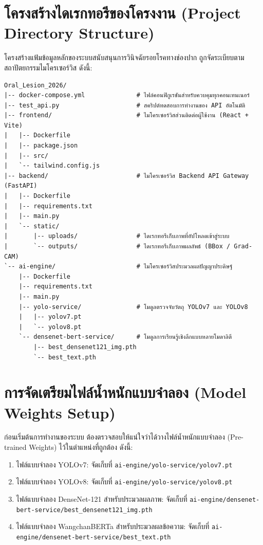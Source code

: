 \section{โครงสร้างไดเรกทอรีของโครงงาน (Project Directory Structure)}
โครงสร้างแฟ้มข้อมูลหลักของระบบสนับสนุนการวินิจฉัยรอยโรคทางช่องปาก ถูกจัดระเบียบตามสถาปัตยกรรมไมโครเซอร์วิส ดังนี้:

\begin{verbatim}
Oral_Lesion_2026/
|-- docker-compose.yml              # ไฟล์คอนฟิกูเรชันสำหรับควบคุมทุกคอนเทนเนอร์
|-- test_api.py                     # สคริปต์ทดสอบการทำงานของ API อัตโนมัติ
|-- frontend/                       # ไมโครเซอร์วิสส่วนติดต่อผู้ใช้งาน (React + Vite)
|   |-- Dockerfile
|   |-- package.json
|   |-- src/
|   `-- tailwind.config.js
|-- backend/                        # ไมโครเซอร์วิส Backend API Gateway (FastAPI)
|   |-- Dockerfile
|   |-- requirements.txt
|   |-- main.py
|   `-- static/
|       |-- uploads/                # ไดเรกทอรีเก็บภาพที่อัปโหลดเข้าสู่ระบบ
|       `-- outputs/                # ไดเรกทอรีเก็บภาพผลลัพธ์ (BBox / Grad-CAM)
`-- ai-engine/                      # ไมโครเซอร์วิสประมวลผลปัญญาประดิษฐ์
    |-- Dockerfile
    |-- requirements.txt
    |-- main.py
    |-- yolo-service/               # โมดูลตรวจจับวัตถุ YOLOv7 และ YOLOv8
    |   |-- yolov7.pt
    |   `-- yolov8.pt
    `-- densenet-bert-service/      # โมดูลการเรียนรู้เชิงลึกแบบหลายโมดาลิตี
        |-- best_densenet121_img.pth
        `-- best_text.pth
\end{verbatim}

\section{การจัดเตรียมไฟล์น้ำหนักแบบจำลอง (Model Weights Setup)}
ก่อนเริ่มต้นการทำงานของระบบ ต้องตรวจสอบให้แน่ใจว่าได้วางไฟล์น้ำหนักแบบจำลอง (Pre-trained Weights) ไว้ในตำแหน่งที่ถูกต้อง ดังนี้:
\begin{enumerate}
    \item ไฟล์แบบจำลอง YOLOv7: จัดเก็บที่ \texttt{ai-engine/yolo-service/yolov7.pt}
    \item ไฟล์แบบจำลอง YOLOv8: จัดเก็บที่ \texttt{ai-engine/yolo-service/yolov8.pt}
    \item ไฟล์แบบจำลอง DenseNet-121 สำหรับประมวลผลภาพ: จัดเก็บที่ \texttt{ai-engine/densenet-bert-service/best\_densenet121\_img.pth}
    \item ไฟล์แบบจำลอง WangchanBERTa สำหรับประมวลผลข้อความ: จัดเก็บที่ \texttt{ai-engine/densenet-bert-service/best\_text.pth}
\end{enumerate}


